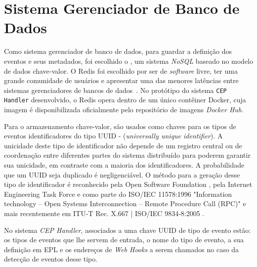 \section{Sistema Gerenciador de Banco de Dados}
Como sistema gerenciador de banco de dados, para guardar a definição dos eventos e seus metadados, foi escolhido o \cite{Redis}, um sistema \textit{NoSQL} baseado no modelo de dados chave-valor.
O Redis foi escolhido por ser de \textit{software} livre, ter uma grande comunidade de usuários e apresentar uma das menores latências entre sistemas gerenciadores de bancos de dados~\citep{10.14778/2367502.2367512}.
No protótipo do sistema \texttt{CEP Handler} desenvolvido, o Redis opera dentro de um único contêiner Docker, cuja imagem é disponibilizada oficialmente pelo repositório de imagens \textit{Docker Hub}.
 

Para o armazenamento chave-valor, são usados como chaves para os tipos de eventos identificadores do tipo UUID - (\textit{universally unique identifier}). A unicidade deste tipo de identificador não depende de um registro central ou de coordenação entre diferentes partes do sistema distribuído para poderem garantir sua unicidade, em contraste com a maioria dos identificadores. A probabilidade que um UUID seja duplicado é negligenciável. O método para a geração desse tipo de identificador é reconhecido pela Open Software Foundation
\citep{osf}, 
pela  Internet Engineering Task Force %
\citep{ietf}
e como parte do  ISO/IEC 11578:1996 "Information technology – Open Systems Interconnection – Remote Procedure Call (RPC)" e mais recentemente em  ITU-T Rec. X.667 | ISO/IEC 9834-8:2005
\citep{ISOUUID}.%

No sistema \textit{CEP Handler}, associados a  uma chave UUID de tipo de evento estão: os tipos de eventos que lhe servem de entrada, o nome do tipo de evento, a sua definição em EPL e os endereços de \textit{Web Hooks} a serem chamados no caso da detecção de eventos desse tipo.


